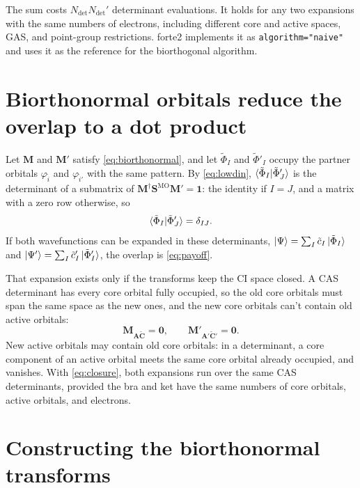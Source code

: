 \documentclass[aip,jcp,preprint]{revtex4-1}
\newcommand{\bvec}[1]{\mathbf{#1}}
\newcommand{\SMO}{\bvec{S}^{\mathrm{MO}}}
\newcommand{\Ndet}{N_\mathrm{det}}
\begin{document}
The sum costs $\Ndet\Ndet'$ determinant evaluations.
It holds for any two expansions with the same numbers of electrons, including different core and active spaces, GAS, and point-group restrictions.
forte2 implements it as \texttt{algorithm="naive"} and uses it as the reference for the biorthogonal algorithm.

\section{Biorthonormal orbitals reduce the overlap to a dot product}
\label{sec:dot}

Let $\bvec{M}$ and $\bvec{M}'$ satisfy \cref{eq:biorthonormal}, and let $\tilde{\Phi}_I$ and $\tilde{\Phi}'_I$ occupy the partner orbitals $\varphi_{\tilde{i}}$ and $\varphi_{\tilde{i}'}$ with the same pattern.
By \cref{eq:lowdin}, $\braket{\tilde{\Phi}_I|\tilde{\Phi}'_J}$ is the determinant of a submatrix of $\bvec{M}^\dagger\SMO\bvec{M}' = \bvec{1}$: the identity if $I = J$, and a matrix with a zero row otherwise, so
\begin{equation}
 \braket{\tilde{\Phi}_I|\tilde{\Phi}'_J} = \delta_{IJ}.
\end{equation}
If both wavefunctions can be expanded in these determinants, $\ket{\Psi} = \sum_I \tilde{c}_I\ket{\tilde{\Phi}_I}$ and $\ket{\Psi'} = \sum_I \tilde{c}'_I\ket{\tilde{\Phi}'_I}$, the overlap is \cref{eq:payoff}.

That expansion exists only if the transforms keep the CI space closed.
A CAS determinant has every core orbital fully occupied, so the old core orbitals must span the same space as the new ones, and the new core orbitals can't contain old active orbitals:
\begin{equation}
 \bvec{M}_{\bvec{A}\tilde{\bvec{C}}} = \bvec{0},
 \qquad
 \bvec{M}'_{\bvec{A}'\tilde{\bvec{C}}'} = \bvec{0}.
 \label{eq:closure}
\end{equation}
New active orbitals may contain old core orbitals: in a determinant, a core component of an active orbital meets the same core orbital already occupied, and vanishes.
With \cref{eq:closure}, both expansions run over the same CAS determinants, provided the bra and ket have the same numbers of core orbitals, active orbitals, and electrons.

\section{Constructing the biorthonormal transforms}
\label{sec:construct}
\end{document}
